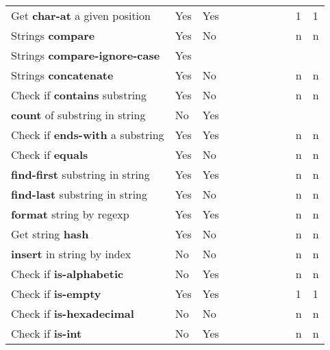 \documentclass[anonymous,sigplan,review,11pt,nonacm,natbib=false]{acmart}
\begin{document}
\begin{longtable}{lllllllllll}
        Get \textbf{char-at} a given position & Yes & Yes &  &  &  & &  &  & 1 & 1 \\

        Strings \textbf{compare} & Yes & No &  &  &  & &  &  & n & n \\

        Strings \textbf{compare-ignore-case} & Yes &  &  &  &  & &  &  &  & \\

        Strings \textbf{concatenate} & Yes & No &  &  &  & &  &  & n & n \\

        Check if \textbf{contains} substring & Yes & No &  &  &  & &  &  & n & n \\

        \textbf{count} of substring in string & No & Yes &  &  &  & &  &  &  & \\

        Check if \textbf{ends-with} a substring & Yes & Yes &  &  &  & &  &  & n & n \\

        Check if \textbf{equals} & Yes & No &  &  &  & &  &  & n & n \\

        \textbf{find-first} substring in string & Yes & Yes &  &  &  & &  &  & n & n \\

        \textbf{find-last} substring in string & Yes & No &  &  &  & &  &  & n & n \\

        \textbf{format} string by regexp & Yes & Yes &  &  &  & &  &  & n & n \\

        Get string \textbf{hash} & Yes & No &  &  &  & &  &  & n & n \\

        \textbf{insert} in string by index & No & No &  &  &  & &  &  & n & n \\

        Check if \textbf{is-alphabetic} & No & Yes &  &  &  & &  &  & n & n \\

        Check if \textbf{is-empty} & Yes & Yes &  &  &  & &  &  & 1 & 1 \\

        Check if \textbf{is-hexadecimal} & No & No &  &  &  & &  &  & n & n \\

        Check if \textbf{is-int} & No & Yes &  &  &  & &  &  & n & n \\


\end{longtable}
\end{document}
